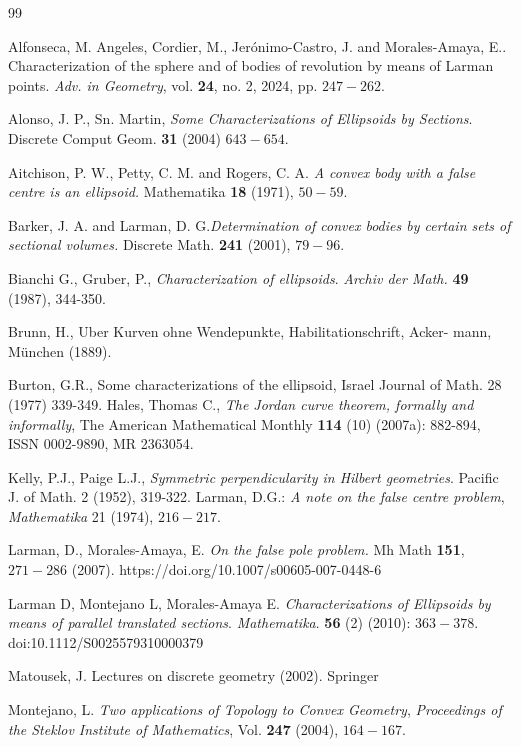 \documentclass[12pt]{amsart}
\begin{document}
\begin{thebibliography}{99}

 Alfonseca, M. Angeles, Cordier, M., Jer\'onimo-Castro, J. and Morales-Amaya, E..  Characterization of the sphere and of bodies of revolution by means of Larman points. \emph{Adv. in Geometry}, vol. \textbf{24}, no. 2, 2024, pp. $247-262$.


 Alonso, J. P.,  Sn. Martin, \emph{Some Characterizations of Ellipsoids by Sections}. Discrete Comput Geom. {\bf 31}  (2004) $643-654$.

  Aitchison, P. W., Petty, C. M. and Rogers, C. A.  \emph{A convex body with a false centre is an ellipsoid.} Mathematika {\bf 18} (1971), $50-59$.

  Barker, J. A.  and Larman, D. G.\emph{Determination of convex bodies by certain sets of sectional volumes.} Discrete Math. {\bf 241} (2001), $79-96$.

 Bianchi G.,  Gruber, P.,  \emph{Characterization of ellipsoids}.  \emph{Archiv der Math.} \textbf{49} (1987), 344-350.

 Brunn, H., Uber Kurven ohne Wendepunkte, Habilitationschrift, Acker-
mann, M\"{u}nchen (1889).
 
 Burton, G.R., Some characterizations of the ellipsoid, Israel Journal of
Math. 28 (1977) 339-349.
 Hales, Thomas C., \emph{The Jordan curve theorem, formally and informally}, The American Mathematical Monthly {\bf 114} (10) (2007a): 882-894, ISSN 0002-9890, MR 2363054.

 Kelly, P.J., Paige L.J., \textit{Symmetric perpendicularity in Hilbert geometries}. Pacific J. of Math. 2 (1952), 319-322.
  Larman, D.G.: \emph{A note on the false centre problem}, \textit{Mathematika} 21 (1974), $216-217$.

 Larman, D., Morales-Amaya, E. \emph{On the false pole problem.} Mh Math \textbf{151}, $271-286$ (2007). https://doi.org/10.1007/s00605-007-0448-6


 Larman D, Montejano L, Morales-Amaya E. \emph{Characterizations of Ellipsoids by means of parallel translated sections}. \textit{Mathematika}. \textbf{56} (2) (2010): $363-378$. doi:10.1112/S0025579310000379

  Matousek, J. Lectures on discrete geometry (2002). Springer
 
 Montejano, L. \emph{Two applications of Topology to Convex Geometry},
\textit{ Proceedings of the Steklov Institute of Mathematics}, Vol. \textbf{247} (2004),
$164-167$.


\end{thebibliography}
\end{document}
